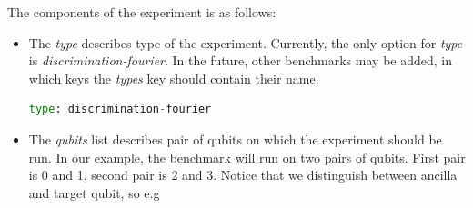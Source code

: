\documentclass[preprint,12pt, a4paper, dvipsnames]{elsarticle}
\newcommand{\1}{{\rm 1\hspace{-0.9mm}l}}
\begin{document}
The components of the experiment is as follows:
\begin{itemize}
	\item The \textit{type} describes type of the experiment. Currently, the only option for \textit{type} is \textit{discrimination-fourier}. In the future, other benchmarks may be added, in which keys the \textit{types} key should contain their name.
	\begin{lstlisting}[language=Python]
type: discrimination-fourier
	\end{lstlisting}
	\item The \textit{qubits} list describes pair of qubits on which the experiment should be run. In our example, the benchmark will run on two pairs of qubits. First pair is 0 and 1, second pair is 2 and 3.
	Notice that we distinguish between ancilla and target qubit, so e.g
	

\end{itemize}
\end{document}
